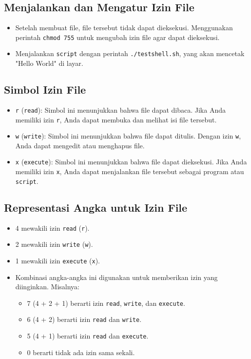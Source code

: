 \documentclass{article}
\begin{document}
\subsection{Menjalankan dan Mengatur Izin File}
\begin{itemize}
    \item Setelah membuat file, file tersebut tidak dapat dieksekusi. Menggunakan perintah \texttt{chmod 755} untuk mengubah izin file agar dapat dieksekusi.
    \item Menjalankan \texttt{script} dengan perintah \texttt{./testshell.sh}, yang akan mencetak "Hello World" di layar.
\end{itemize}

\subsection{Simbol Izin File}
\begin{itemize}
    \item \texttt{r} (\texttt{read}): Simbol ini menunjukkan bahwa file dapat dibaca. Jika Anda memiliki izin \texttt{r}, Anda dapat membuka dan melihat isi file tersebut.
    \item \texttt{w} (\texttt{write}): Simbol ini menunjukkan bahwa file dapat ditulis. Dengan izin \texttt{w}, Anda dapat mengedit atau menghapus file.
    \item \texttt{x} (\texttt{execute}): Simbol ini menunjukkan bahwa file dapat dieksekusi. Jika Anda memiliki izin \texttt{x}, Anda dapat menjalankan file tersebut sebagai program atau \texttt{script}.
\end{itemize}

\subsection{Representasi Angka untuk Izin File}
\begin{itemize}
    \item 4 mewakili izin \texttt{read} (\texttt{r}).
    \item 2 mewakili izin \texttt{write} (\texttt{w}).
    \item 1 mewakili izin \texttt{execute} (\texttt{x}).
    \item Kombinasi angka-angka ini digunakan untuk memberikan izin yang diinginkan. Misalnya:
          \begin{itemize}
              \item 7 (4 + 2 + 1) berarti izin \texttt{read}, \texttt{write}, dan \texttt{execute}.
              \item 6 (4 + 2) berarti izin \texttt{read} dan \texttt{write}.
              \item 5 (4 + 1) berarti izin \texttt{read} dan \texttt{execute}.
              \item 0 berarti tidak ada izin sama sekali.
          \end{itemize}
\end{itemize}
\end{document}
